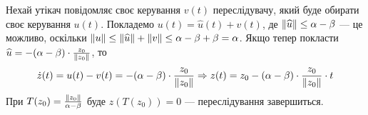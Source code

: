 Нехай утікач повідомляє своє керування $v(t)$ переслідувачу, який буде обирати своє керування $u(t)$.
Покладемо $u(t) = \widehat{u}(t) + v(t)$, де $\left\Vert \widehat{u} \right\Vert \leq \alpha - \beta$ --- це можливо,
оскільки $\left\Vert u \right\Vert \leq \left\Vert \widehat{u} \right\Vert + \left\Vert v \right\Vert \leq \alpha - \beta + \beta = \alpha$.
Якщо тепер покласти $\widehat{u} = - (\alpha - \beta) \cdot \frac{z_0}{\left\Vert z_0 \right\Vert}$, то
\begin{gather*}
    \dot{z}(t) = u(t) - v(t) = -(\alpha - \beta) \cdot \frac{z_0}{\left\Vert z_0 \right\Vert} \Rightarrow 
    z(t) = z_0 -(\alpha - \beta) \cdot \frac{z_0}{\left\Vert z_0 \right\Vert} \cdot t
\end{gather*}
При $T(z_0) = \frac{\left\Vert z_0 \right\Vert}{\alpha - \beta}$ буде $z(T(z_0)) = 0$ --- переслідування завершиться.